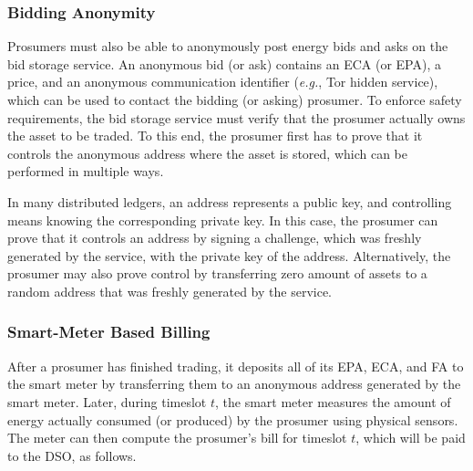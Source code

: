 \subsubsection{Bidding Anonymity}
Prosumers must also be able to anonymously post energy bids and asks on the
bid storage service.  An anonymous bid (or ask) contains an ECA (or
EPA), a price, and an anonymous communication identifier (\emph{e.g.},
Tor hidden service), which can be used to contact the bidding (or
asking) prosumer.  To enforce safety requirements, the bid storage
service must verify that the prosumer actually owns the asset to be
traded.  To this end, the prosumer first has to prove that it controls
the anonymous address where the asset is stored, which can be
performed in multiple ways.

In many distributed ledgers, an address represents a public key, and
controlling means knowing the corresponding private key.  In this
case, the prosumer can prove that it controls an address by signing a
challenge, which was freshly generated by the service, with the
private key of the address.  Alternatively, the prosumer may also
prove control by transferring zero amount of assets to a random
address that was freshly generated by the service.


\subsubsection{Smart-Meter Based Billing}
After a prosumer has finished trading, it deposits all of its EPA,
ECA, and FA to the smart meter by transferring them to an anonymous
address generated by the smart meter.  Later, during timeslot $t$, the
smart meter measures the amount of energy actually consumed (or
produced) by the prosumer using physical sensors.  The meter can then
compute the prosumer's bill for timeslot $t$, which will be paid to
the DSO, as follows. 


